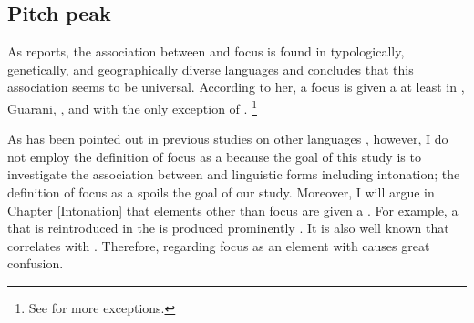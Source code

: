 %
%
\subsection{Pitch peak}

As  reports,
the association between  and focus
is found in typologically, genetically, and geographically diverse languages
and concludes that this association seems to be universal.
According to her,
a focus is given a  at least in , Guarani, , and 
with the only exception of  \cite[see also the references in her work and][]{buring07}.%
\footnote{
See  for more exceptions.
}

As has been pointed out in previous studies on other languages \cite[e.g., ][\S 6.2]{jackendoff72},
however,
I do not employ the definition of focus as a 
because the goal of this study is to investigate the association between  and linguistic forms including intonation;
the definition of focus as a  spoils the goal of our study.
Moreover,
I will argue in Chapter \ref{Intonation} that 
elements other than focus are given a .
For example, a  that is reintroduced in the  is produced prominently \cite[see also][]{gundel99}.
It is also well known that
 correlates with .
Therefore, regarding focus as an element with  causes great confusion.




